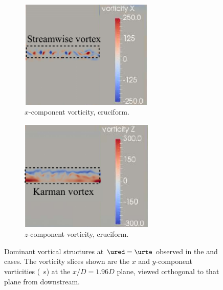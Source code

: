 \documentclass[a4paper,fleqn]{cas-sc}
\begin{document}
\begin{figure}
  \begin{subfigure}[h]{0.4\textwidth}
    \centering
    \includegraphics[width=0.7\textwidth]{figs/vorx00}
    \caption{$x$-component vorticity, \angth{} cruciform.}
    \label{fig:vorx00}
  \end{subfigure}
  \begin{subfigure}[h]{0.4\textwidth}
    \centering
    \includegraphics[width=0.7\textwidth]{figs/vorz00}
    \caption{$z$-component vorticity, \angth{} cruciform.}
    \label{fig:vorz00}
  \end{subfigure}

  \caption{Dominant vortical structures at $\ured = \urte$ observed in the \angtw{} and \angon{} cases. The vorticity slices shown are the $x$ and $y$-component vorticities (\si{\per\second}) at the $x/D = 1.96D$ plane, viewed orthogonal to that plane from downstream.} \label{fig:vortStruct22500}
\end{figure}
\end{document}
